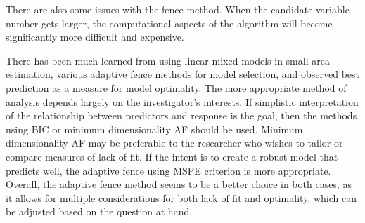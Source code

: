 \documentclass[11pt,letter]{article}
\begin{document}
There are also some issues with the fence method. When the candidate variable number gets larger, the computational aspects of the algorithm will become significantly more difficult and expensive. 

There has been much learned from using linear mixed models in small area estimation, various adaptive fence methods for model selection, and observed best prediction as a measure for model optimality.  The more appropriate method of analysis depends largely on the investigator’s interests.  If simplistic interpretation of the relationship between predictors and response is the goal, then the methods using BIC or minimum dimensionality AF should be used.  Minimum dimensionality AF may be preferable to the researcher who wishes to tailor or compare measures of lack of fit.  If the intent is to create a robust model that predicts well, the adaptive fence using MSPE criterion is more appropriate.  Overall, the adaptive fence method seems to be a better choice in both cases, as it allows for multiple considerations for both lack of fit and optimality, which can be adjusted based on the question at hand.
\end{document}
